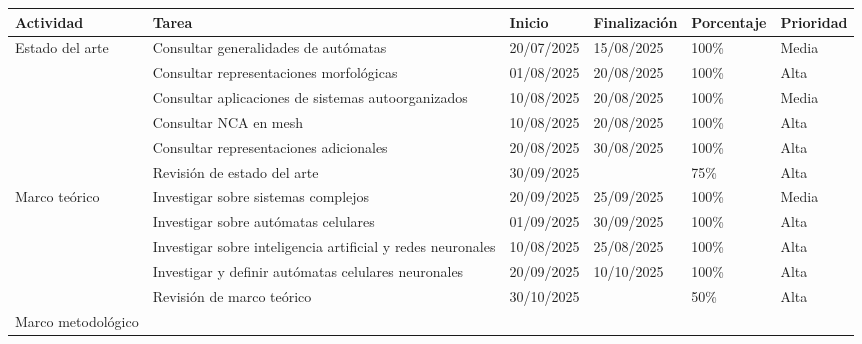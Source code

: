 \documentclass[letterpaper,10pt,oneside]{article}
\begin{document}
\begin{table}[htbp]
	\centering
	\begin{tabular}{|p{}|p{}|p{}|p{}|p{}|p{}|}
		\hline
		\textbf{Actividad} & 
		\textbf{Tarea} &  
		\textbf{Inicio} & 
		\textbf{Finalización} & 
		\textbf{Porcentaje} & 
		\textbf{Prioridad} \\
		\hline
		\multirow{6}{3\textwidth}{\parbox{0.15\textwidth}{\centering Estado del arte}} 
		& Consultar generalidades de autómatas & 20/07/2025 & 15/08/2025 & 100\% & Media \\ \cline{2-6}
		
		& Consultar representaciones morfológicas & 01/08/2025 & 20/08/2025 & 100\% & Alta \\ \cline{2-6}
		& Consultar aplicaciones de sistemas autoorganizados & 10/08/2025 & 20/08/2025 & 100\% & Media \\ \cline{2-6}
		
		& Consultar NCA en mesh & 10/08/2025 & 20/08/2025 & 100\% & Alta \\ \cline{2-6}
		
		& Consultar representaciones adicionales & 20/08/2025 & 30/08/2025 & 100\% & Alta  \\ \cline{2-6}
		
		& Revisión de estado del arte & 30/09/2025 &  & 75\% & Alta  \\ \hline
		
		\multirow{5}{0.15\textwidth}{\parbox{0.15\textwidth}{\centering Marco teórico}} 
		
		& Investigar sobre sistemas complejos & 20/09/2025 & 25/09/2025 & 100\% & Media \\ \cline{2-6}
		
		& Investigar sobre autómatas celulares & 01/09/2025 & 30/09/2025 & 100\% & Alta \\ \cline{2-6}
		
		& Investigar sobre inteligencia artificial y redes neuronales & 10/08/2025 & 25/08/2025 & 100\% & Alta \\ \cline{2-6}
		
		& Investigar y definir autómatas celulares neuronales & 20/09/2025 & 10/10/2025 & 100\% & Alta \\ \cline{2-6}
		
		& Revisión de marco teórico & 30/10/2025 &  & 50\% & Alta  \\ \hline
		
		\multirow{5}{0.15\textwidth}{\parbox{0.15\textwidth}{\centering Marco metodológico}} 
		

\end{tabular}
\end{table}
\end{document}
